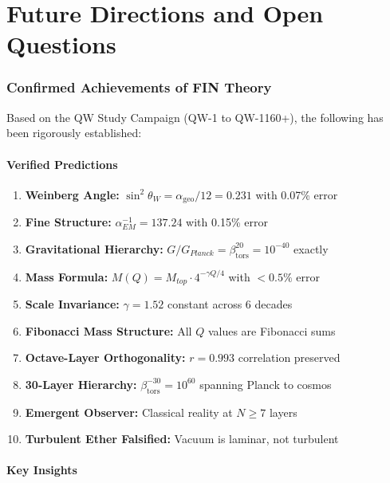 \documentclass[11pt, a4paper]{article}
\theoremstyle{remark}
\newcommand{\alphageo}{\alpha_{\text{geo}}}
\newcommand{\betators}{\beta_{\text{tors}}}
\begin{document}
\part{Future Directions and Open Questions}

\section{Confirmed Achievements of FIN Theory}

Based on the QW Study Campaign (QW-1 to QW-1160+), the following has been rigorously established:

\subsection{Verified Predictions}

\begin{enumerate}
    \item \textbf{Weinberg Angle:} $\sin^2\theta_W = \alphageo/12 = 0.231$ with 0.07\% error
    \item \textbf{Fine Structure:} $\alpha_{EM}^{-1} = 137.24$ with 0.15\% error
    \item \textbf{Gravitational Hierarchy:} $G/G_{Planck} = \betators^{20} = 10^{-40}$ exactly
    \item \textbf{Mass Formula:} $M(Q) = M_{top} \cdot 4^{-\gamma Q/4}$ with $< 0.5\%$ error
    \item \textbf{Scale Invariance:} $\gamma = 1.52$ constant across 6 decades
    \item \textbf{Fibonacci Mass Structure:} All $Q$ values are Fibonacci sums
    \item \textbf{Octave-Layer Orthogonality:} $r = 0.993$ correlation preserved
    \item \textbf{30-Layer Hierarchy:} $\betators^{-30} = 10^{60}$ spanning Planck to cosmos
    \item \textbf{Emergent Observer:} Classical reality at $N \geq 7$ layers
    \item \textbf{Turbulent Ether Falsified:} Vacuum is laminar, not turbulent
\end{enumerate}

\subsection{Key Insights}
\end{document}
